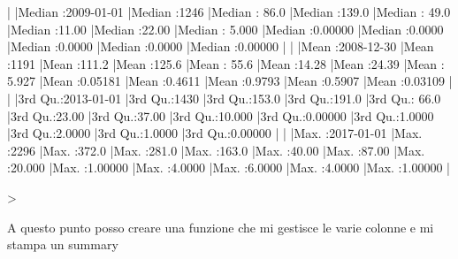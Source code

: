 \documentclass{article}
\begin{document}
\begin{Schunk}
\begin{Soutput}
|   |Median :2009-01-01 |Median :1246 |Median : 86.0              |Median :139.0          |Median : 49.0   |Median :11.00                   |Median :22.00              |Median : 5.000              |Median :0.00000                             |Median :0.0000                      |Median :0.0000                             |Median :0.0000              |Median :0.00000                      |
|   |Mean   :2008-12-30 |Mean   :1191 |Mean   :111.2              |Mean   :125.6          |Mean   : 55.6   |Mean   :14.28                   |Mean   :24.39              |Mean   : 5.927              |Mean   :0.05181                             |Mean   :0.4611                      |Mean   :0.9793                             |Mean   :0.5907              |Mean   :0.03109                      |
|   |3rd Qu.:2013-01-01 |3rd Qu.:1430 |3rd Qu.:153.0              |3rd Qu.:191.0          |3rd Qu.: 66.0   |3rd Qu.:23.00                   |3rd Qu.:37.00              |3rd Qu.:10.000              |3rd Qu.:0.00000                             |3rd Qu.:1.0000                      |3rd Qu.:2.0000                             |3rd Qu.:1.0000              |3rd Qu.:0.00000                      |
|   |Max.   :2017-01-01 |Max.   :2296 |Max.   :372.0              |Max.   :281.0          |Max.   :163.0   |Max.   :40.00                   |Max.   :87.00              |Max.   :20.000              |Max.   :1.00000                             |Max.   :4.0000                      |Max.   :6.0000                             |Max.   :4.0000              |Max.   :1.00000                      |
\end{Soutput}
\begin{Sinput}
> 
\end{Sinput}
\end{Schunk}
A questo punto posso creare una funzione che mi gestisce le varie colonne e mi stampa un summary
\end{document}
